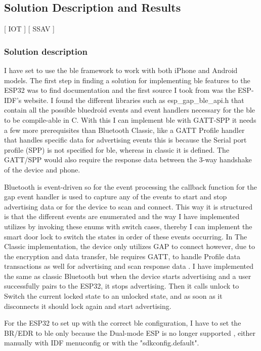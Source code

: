 \subsection{Solution Description and Results}
[ IOT ] [ SSAV ] 
\subsubsection{\textbf{Solution description}}
 I have set to use the \gls{ble} framework to work with both iPhone and Android models. The first step in finding a solution for implementing \gls{ble} features to the ESP32 was to find documentation and the first source I took from was the ESP-IDF's website. I found the different libraries such as esp\_gap\_ble\_api.h that contain all the possible bluedroid events and event handlers necessary for the \gls{ble} to be compile-able in C. With this I can implement \gls{ble} with GATT-SPP it needs a few more prerequisites than Bluetooth Classic, like a GATT Profile handler that handles specific data for advertising events this is because the Serial port profile (SPP) is not specified for \gls{ble}, whereas in classic it is defined. The GATT/SPP would also require the response data between the 3-way handshake of the device and phone.
 
 Bluetooth is event-driven so for the event processing the callback function for the gap event handler is used to capture any of the events to start and stop advertising data or for the device to scan and connect. This way it is structured is that the different events are enumerated and the way I have implemented utilizes by invoking these enums with switch cases, thereby I can implement the smart door lock to switch the states in order of these events occurring. In The Classic implementation, the device only utilizes GAP to connect however, due to the encryption and data transfer, \gls{ble} requires GATT, to handle Profile data transactions as well for advertising and scan response data \cite{ESPBLEGAP}. I have implemented the same as classic Bluetooth but when the device starts advertising and a user successfully pairs to the ESP32, it stops advertising. Then it calls unlock to Switch the current locked state to an unlocked state, and as soon as it disconnects it should lock again and start advertising. 

For the ESP32 to set up with the correct \gls{ble} configuration, I have to set the BR/EDR to \gls{ble} only because the Dual-mode ESP is no longer supported \cite{esp32beans}, either manually with IDF menuconfig or with the "sdkconfig.default". 

